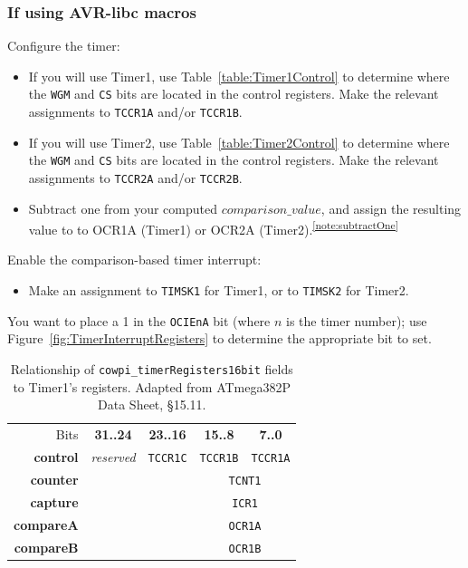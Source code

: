 \subsubsection{If using AVR-libc macros}

Configure the timer:
\begin{itemize}
\item If you will use Timer1, use Table~\ref{table:Timer1Control} to determine
    where the \texttt{WGM} and \texttt{CS} bits are located in the control
    registers. Make the relevant assignments to \lstinline{TCCR1A} and/or
    \lstinline{TCCR1B}.
\item If you will use Timer2, use Table~\ref{table:Timer2Control} to determine
    where the \texttt{WGM} and \texttt{CS} bits are located in the control
    registers. Make the relevant assignments to \lstinline{TCCR2A} and/or
    \lstinline{TCCR2B}.
\item Subtract one from your computed $comparison\_value$, and assign the
    resulting value to to OCR1A (Timer1) or OCR2A (Timer2).\textsuperscript{\ref{note:subtractOne}}
\end{itemize}

Enable the comparison-based timer interrupt:
\begin{itemize}
\item Make an assignment to \texttt{TIMSK1} for Timer1, or to \texttt{TIMSK2}
    for Timer2.
\end{itemize}

You want to place a 1 in the \texttt{OCIEnA} bit (where $n$ is the timer
number); use Figure~\ref{fig:TimerInterruptRegisters} to determine the
appropriate bit to set.

\begin{table}[p]
    \centering \small
    \begin{tabular}{|r||c|c|c|c||}
        \hline
        Bits                & \textbf{31..24}   & \textbf{23..16}   & \textbf{15..8}    & \textbf{7..0}     \\ \cline{2-5}
        \textbf{control}    & \textit{reserved} & \texttt{TCCR1C}   & \texttt{TCCR1B}   & \texttt{TCCR1A}   \\
        \textbf{counter}    & \multicolumn{2}{c|}{}                 & \multicolumn{2}{c||}{\texttt{TCNT1}}  \\
        \textbf{capture}    & \multicolumn{2}{c|}{}                 & \multicolumn{2}{c||}{\texttt{ICR1}}   \\
        \textbf{compareA}   & \multicolumn{2}{c|}{}                 & \multicolumn{2}{c||}{\texttt{OCR1A}}  \\
        \textbf{compareB}   & \multicolumn{2}{c|}{}                 & \multicolumn{2}{c||}{\texttt{OCR1B}}  \\ \hline
    \end{tabular}
    \caption{Relationship of \lstinline{cowpi_timerRegisters16bit} fields to Timer1's registers. \tiny Adapted from ATmega382P Data Sheet, §15.11. \label{table:Timer1Registers}}
\end{table}

